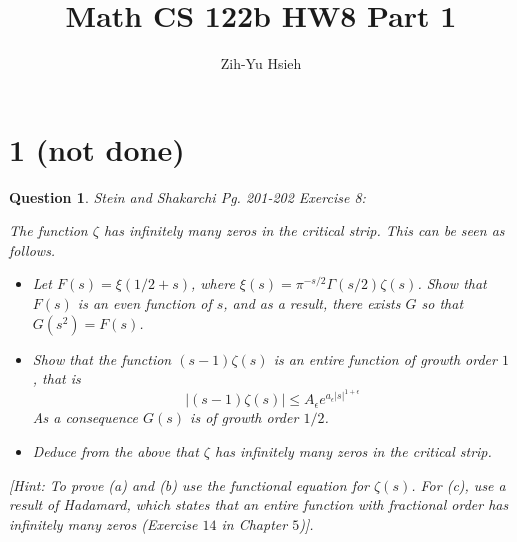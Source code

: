 \documentclass{article}
\title{Math CS 122b HW8 Part 1}
\author{Zih-Yu Hsieh}
\newtheorem{question}{Question}
\begin{document}
\maketitle

\section*{1 (not done)}
\begin{myBox}[]{}
    \begin{question}
        Stein and Shakarchi Pg. 201-202 Exercise 8:

        The function $\zeta$ has infinitely many zeros in the critical strip. This can be seen as follows.
        \begin{itemize}
            \item[(a)] Let $F(s)=\xi(1/2+s)$, where $\xi(s)=\pi^{-s/2}\Gamma(s/2)\zeta(s)$. 
            Show that $F(s)$ is an even function of $s$, and as a result, there exists $G$ so that $G(s^2)=F(s)$.
            \item[(b)] Show that the function $(s-1)\zeta(s)$ is an entire function of growth order $1$, that is 
            $$|(s-1)\zeta(s)|\leq A_\epsilon e^{a_\epsilon |s|^{1+\epsilon}}$$
            As a consequence $G(s)$ is of growth order $1/2$.
            \item[(c)] Deduce from the above that $\zeta$ has infinitely many zeros in the critical strip.
        \end{itemize}
        [Hint: To prove (a) and (b) use the functional equation for $\zeta(s)$. For (c), use a result of Hadamard, which states that an entire function with fractional order has infinitely many zeros (Exercise $14$ in Chapter $5$)].
    \end{question}
\end{myBox}
\end{document}
